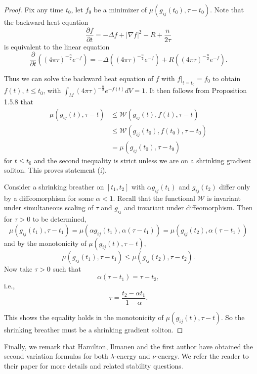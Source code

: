 \begin{proof}
Fix any time $t_0$, let $f_0$ be a minimizer of
$\mu(g_{ij}(t_0),\tau-t_0).$ Note that the backward heat equation
$$
\frac{\partial f}{\partial t}=-\Delta f+|\nabla
f|^2-R+\frac{n}{2\tau}
$$
is equivalent to the linear equation
$$
\frac{\partial }{\partial
t}((4\pi\tau)^{-\frac{n}{2}}e^{-f})=-\Delta
((4\pi\tau)^{-\frac{n}{2}}e^{-f})+R((4\pi\tau)^{-\frac{n}{2}}e^{-f}).
$$

Thus we can solve the backward heat equation of $f$ with
$f|_{t=t_0}=f_0$ to obtain $f(t)$, $t\leq t_0$, with
$\int_M(4\pi\tau)^{-\frac{n}{2}}e^{-f(t)}dV=1.$ It then follows
from Proposition 1.5.8 that
\begin{align*}
\mu(g_{ij}(t),\tau-t)
& \leq \mathcal{W}(g_{ij}(t),f(t),\tau-t)\\
& \leq \mathcal{W}(g_{ij}(t_0),f(t_0),\tau-t_0)\\
& = \mu(g_{ij}(t_0),\tau-t_0)
\end{align*}
for $t\leq t_0$ and the second inequality is strict unless we are
on a shrinking gradient soliton. This proves statement (i).

Consider a shrinking breather on $[t_1,t_2]$ with $\alpha
g_{ij}(t_1)$ and $g_{ij}(t_2)$ differ only by a diffeomorphism for
some $\alpha < 1.$ Recall that the functional $\mathcal{W}$ is
invariant under simultaneous scaling of $\tau$ and $g_{ij}$ and
invariant under diffeomorphism. Then for $\tau >0$ to be
determined,
$$
\mu(g_{ij}(t_1),\tau-t_1)=\mu(\alpha
g_{ij}(t_1),\alpha(\tau-t_1))=\mu(g_{ij}(t_2),\alpha(\tau-t_1))
$$
and by the monotonicity of $\mu(g_{ij}(t),\tau-t),$
$$
\mu(g_{ij}(t_1),\tau-t_1)\leq\mu(g_{ij}(t_2),\tau-t_2).
$$
Now take $\tau>0$ such that
$$
\alpha(\tau-t_1)=\tau-t_2,
$$
i.e.,
$$
\tau=\frac{t_2-\alpha t_1}{1-\alpha}.
$$

\noindent This shows the equality holds in the monotonicity of
$\mu(g_{ij}(t),\tau-t).$ So the shrinking breather must be a
shrinking gradient soliton.
\end{proof}

Finally, we remark that Hamilton, Ilmanen and the first author
\cite{Cao04} have obtained the second variation formulas for both
$\lambda$-energy and $\nu$-energy. We refer the reader to their
paper \cite{Cao04}  for more details and related stability
questions.

